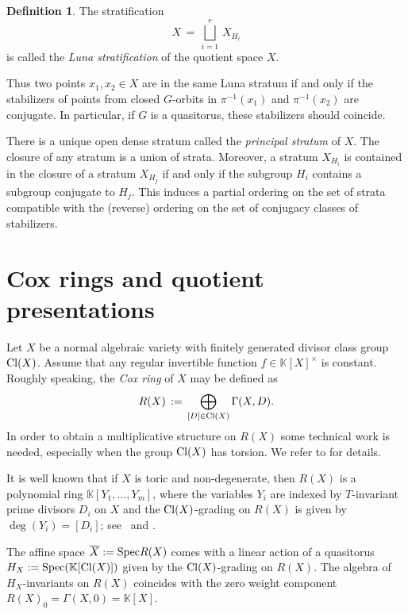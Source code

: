 \documentclass[12pt,a4paper]{amsart}
\theoremstyle{plain}
\theoremstyle{definition}
\newtheorem{definition}{Definition}
\begin{document}
\begin{definition} \label{defls}
The stratification
$$
X \, = \, \bigsqcup_{i=1}^r \, X_{H_i}
$$
is called the {\it Luna stratification} of the quotient space $X$.
\end{definition}

Thus two points $x_1,x_2\in X$ are in the same Luna stratum if and only if
the stabilizers of points from closed $G$-orbits in $\pi^{-1}(x_1)$ and
$\pi^{-1}(x_2)$ are conjugate. In particular, if $G$ is a quasitorus,
these stabilizers should coincide.

There is a unique open dense stratum called the {\it principal
stratum} of $X$. The closure of any stratum is a union of strata.
Moreover, a stratum $X_{H_i}$  is contained in the closure of a stratum
$X_{H_j}$ if and only if the subgroup $H_i$ contains a subgroup conjugate to $H_j$.
This induces a partial ordering on the set of strata compatible with the (reverse)
ordering on the set of conjugacy classes of stabilizers.

\section{Cox rings and quotient presentations}
\label{sec4}

Let $X$ be a normal algebraic variety with finitely generated divisor class group ${\mathop{\rm Cl}}(X)$.
Assume that any regular invertible function $f\in {{\mathbb K}}[X]^{\times}$ is constant.
Roughly speaking, the {\it Cox ring} of $X$ may be defined as
$$
R(X) \, := \, \bigoplus_{[D]\in {\mathop{\rm Cl}}(X)} \Gamma(X, D).
$$
In order to obtain a multiplicative structure on $R(X)$ some technical work is needed,
especially when the group ${\mathop{\rm Cl}}(X)$ has torsion. We refer to \cite[Section~4]{ADHL} for details.

It is well known that if $X$ is toric and non-degenerate, then $R(X)$ is a polynomial ring
${{\mathbb K}}[Y_1,\ldots,Y_m]$, where the variables $Y_i$ are indexed by $T$-invariant
prime divisors $D_i$ on $X$ and the ${\mathop{\rm Cl}}(X)$-grading on $R(X)$ is given by
$\deg(Y_i)=[D_i]$; see~\cite{Cox} and \cite[Chapter~5]{CLS}.

The affine space
$\overline{X}:={\mathop{\rm Spec}} R(X)$ comes with a linear action of a quasitorus $H_X:={\mathop{\rm Spec}}({{\mathbb K}}[{\mathop{\rm Cl}}(X)])$
given by the ${\mathop{\rm Cl}}(X)$-grading on $R(X)$. The algebra of $H_X$-invariants on $R(X)$
coincides with the zero weight component $R(X)_0=\Gamma(X,0)={{\mathbb K}}[X]$.
\end{document}
